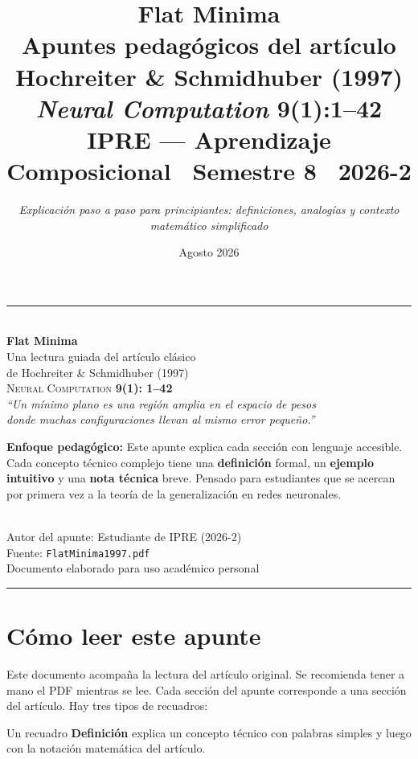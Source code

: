 \documentclass[11pt,a4paper]{article}
\title{\vspace{-2cm}\textbf{\huge Flat Minima}\\[0.5cm] \LARGE Apuntes pedagógicos del artículo\\[0.4cm] \large Hochreiter \& Schmidhuber (1997) \normalsize\textit{Neural Computation} 9(1):1--42\\[0.6cm] \normalsize \textbf{IPRE — Aprendizaje Composicional} \textbar\ Semestre 8 \textbar\ 2026-2}
\author{\textit{Explicación paso a paso para principiantes: definiciones, analogías y contexto matemático simplificado}}
\date{Agosto 2026}
\newcounter{definicion}
\newenvironment{definicion}[1][]{%
  \refstepcounter{definicion}%
  \begin{tcolorbox}[colback=grisclaro,colframe=verdecorado,title=Definición \thedefinicion: #1,breakable]}%
  {\end{tcolorbox}}
\newcounter{ejemplo}
\begin{document}
\begin{titlepage}
\centering
\vspace*{0.5cm}
{\color{azul}\rule{16cm}{2pt}}\\[1.5cm]
{\Huge\bfseries\color{azul} Flat Minima\\[0.3cm]}
{\LARGE Una lectura guiada del artículo clásico\\[0.2cm] de Hochreiter \& Schmidhuber (1997)\\[0.6cm]
\large \textsc{Neural Computation} \textbf{9(1): 1--42}}\\[1.2cm]
{\large\itshape ``Un mínimo plano es una región amplia en el espacio de pesos\\ donde muchas configuraciones llevan al mismo error pequeño.''}\\[2cm]
\begin{tcolorbox}[colback=grisclaro,colframe=azul,width=14cm,arc=4mm]
\textbf{Enfoque pedagógico:}\vspace{0.2cm}\newline
Este apunte explica cada sección con lenguaje accesible. Cada concepto técnico complejo tiene una \textbf{definición} formal, un \textbf{ejemplo intuitivo} y una \textbf{nota técnica} breve. Pensado para estudiantes que se acercan por primera vez a la teoría de la generalización en redes neuronales.
\end{tcolorbox}\\[2cm]
{\small Autor del apunte: Estudiante de IPRE (2026-2) \\ Fuente: \texttt{FlatMinima1997.pdf}}\\[0.5cm]
{\tiny\color{black!40} Documento elaborado para uso académico personal}
\vfill
{\color{grisclaro}\rule{16cm}{0.4pt}}
\end{titlepage}

\tableofcontents
\newpage

\section*{Cómo leer este apunte}

Este documento acompaña la lectura del artículo original. Se recomienda tener a mano el PDF mientras se lee. Cada sección del apunte corresponde a una sección del artículo. Hay tres tipos de recuadros:

\begin{definicion}[Ejemplo de uso]
Un recuadro \textbf{Definición} explica un concepto técnico con palabras simples y luego con la notación matemática del artículo.
\end{definicion}
\end{document}
